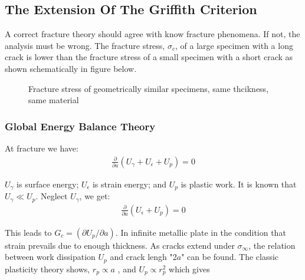 \documentclass[12pt]{article}
\begin{document}
\subsection{The Extension Of The Griffith Criterion}
A correct fracture theory should agree with know fracture phenomena. If not, the analysis must 
be wrong. The fracture stress, $\sigma_c$, of a large specimen with a long crack is lower
than the fracture stress of a small specimen with a short crack as shown schematically in figure
below.


\begin{figure}[H]
    \centering
    \captionsetup{labelformat=empty}
    \caption{Fracture stress of geometrically similar specimens, same thcikness, same material}
\end{figure}

\subsubsection{Global Energy Balance Theory}
At fracture we have:
\begin{align*}
    \frac{\partial}{\partial a}(U_\gamma + U_\epsilon + U_p) = 0 \tag{6} \label{6}
\end{align*}

$U_\gamma$ is surface energy; $U_\epsilon$ is strain energy; and $U_p$ is plastic work. 
It is known that $U_\gamma \ll U_p$. Neglect $U_\gamma$, we get: 
\begin{align*}
    \frac{\partial}{\partial a}(U_\epsilon + U_p) = 0 \tag{7} \label{7}
\end{align*}

This leads to $G_c = (\partial U_p/\partial a)$. In infinite metallic
plate in the condition that strain prevails due to enough thickness. As
cracks extend under $\sigma_\infty$, the relation between work dissipation $U_p$
and crack lengh "2$a$" can be found. The classic plasticity theory shows, $r_p \propto a$ ,
and $U_p \propto r_{p} ^{2}$ which gives
\end{document}
